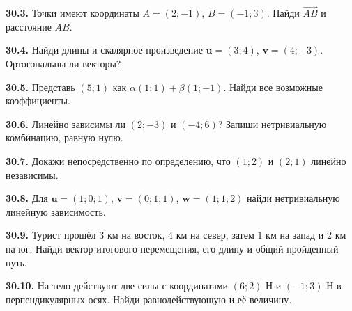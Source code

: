 \noindent\begin{minipage}[t]{\linewidth}\textbf{30.3.} Точки имеют координаты \(A=(2;-1)\), \(B=(-1;3)\). Найди \(\overrightarrow{AB}\) и расстояние \(AB\).\par\end{minipage}\par
\noindent\begin{minipage}[t]{\linewidth}\textbf{30.4.} Найди длины и скалярное произведение \(\symbf u=(3;4)\), \(\symbf v=(4;-3)\). Ортогональны ли векторы?\par\end{minipage}\par
\noindent\begin{minipage}[t]{\linewidth}\textbf{30.5.} Представь \((5;1)\) как \(\alpha(1;1)+\beta(1;-1)\). Найди все возможные коэффициенты.\par\end{minipage}\par
\noindent\begin{minipage}[t]{\linewidth}\textbf{30.6.} Линейно зависимы ли \((2;-3)\) и \((-4;6)\)? Запиши нетривиальную комбинацию, равную нулю.\par\end{minipage}\par
\noindent\begin{minipage}[t]{\linewidth}\textbf{30.7.} Докажи непосредственно по определению, что \((1;2)\) и \((2;1)\) линейно независимы.\par\end{minipage}\par
\noindent\begin{minipage}[t]{\linewidth}\textbf{30.8.} Для \(\symbf u=(1;0;1)\), \(\symbf v=(0;1;1)\), \(\symbf w=(1;1;2)\) найди нетривиальную линейную зависимость.\par\end{minipage}\par
\noindent\begin{minipage}[t]{\linewidth}\textbf{30.9.} Турист прошёл \(3\) км на восток, \(4\) км на север, затем \(1\) км на запад и \(2\) км на юг. Найди вектор итогового перемещения, его длину и общий пройденный путь.\par\end{minipage}\par
\noindent\begin{minipage}[t]{\linewidth}\textbf{30.10.} На тело действуют две силы с координатами \((6;2)\) Н и \((-1;3)\) Н в перпендикулярных осях. Найди равнодействующую и её величину.\par\end{minipage}\par
